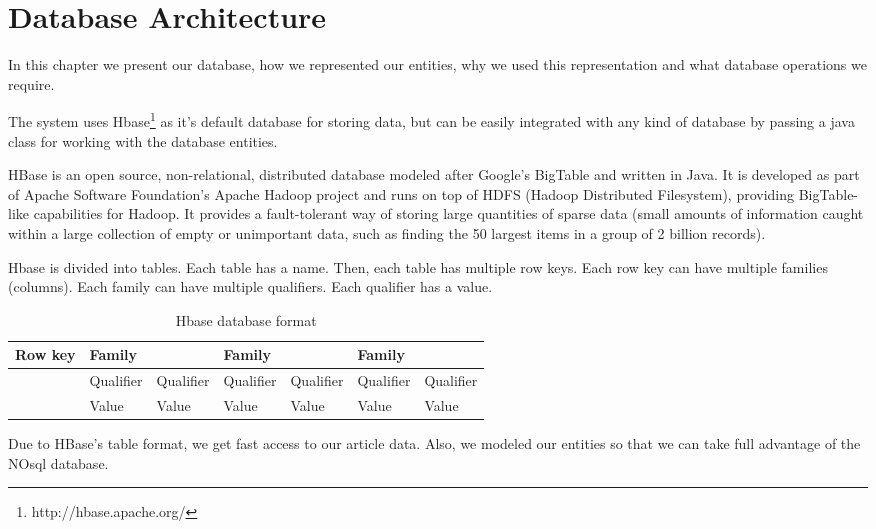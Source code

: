 \chapter{Database Architecture}
\label{chapter:database-architecture}
In this chapter we present our database, how we represented our entities, why we used this representation and what database operations we require.

The system uses Hbase\footnote{http://hbase.apache.org/} as it’s default database for storing data, but can be easily integrated with any kind of database by passing a java class for working with the database entities.

HBase is an open source, non-relational, distributed database modeled after Google's BigTable and written in Java. It is developed as part of Apache Software Foundation's Apache Hadoop project and runs on top of HDFS (Hadoop Distributed Filesystem), providing BigTable-like capabilities for Hadoop. It provides a fault-tolerant way of storing large quantities of sparse data (small amounts of information caught within a large collection of empty or unimportant data, such as finding the 50 largest items in a group of 2 billion records).

Hbase is divided into tables. Each table has a name. Then, each table has multiple row keys. Each row key can have multiple families (columns). Each family can have multiple qualifiers. Each qualifier has a value.

\begin{table}[h]
  \caption{Hbase database format}
\centering
\begin{tabular}{@{}lllllll@{}}

Row key                & Family                         &                                & Family                         &                                & Family    &           \\ \toprule 
& Qualifier                      & Qualifier                      & Qualifier                      & Qualifier                      & Qualifier & Qualifier \\ 
                       & Value                          & Value                          & Value                          & Value                          & Value     & Value     
\end{tabular}
\end{table}

Due to HBase's table format, we get fast access to our article data. Also, we modeled our entities so that we can take full advantage of the NOsql database.

